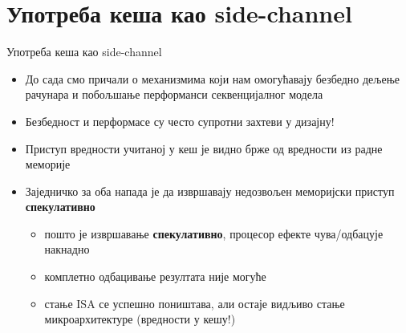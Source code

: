 \documentclass[xcolor=table]{beamer}
\begin{document}
    \section{Употреба кеша као side-channel}
    
    \begin{frame}{Употреба кеша као side-channel}
        \begin{itemize}
            \item До сада смо причали о механизмима који нам омогућавају безбедно дељење рачунара и побољшање перформанси секвенцијалног модела
            \item Безбедност и перформасе су често супротни захтеви у дизајну!
            \item Приступ вредности учитаној у кеш је видно брже од вредности из радне меморије
            \item Заједничко за оба напада је да извршавају недозвољен меморијски приступ \textbf{спекулативно}
            \begin{itemize}
                \item пошто је извршавање \textbf{спекулативно}, процесор ефекте чува/одбацује накнадно
                \item комплетно одбацивање резултата није могуће
                \item стање ISA се успешно поништава, али остаје видљиво стање микроархитектуре (вредности у кешу!)
            \end{itemize}
        \end{itemize}
    \end{frame}
        
\end{document}
